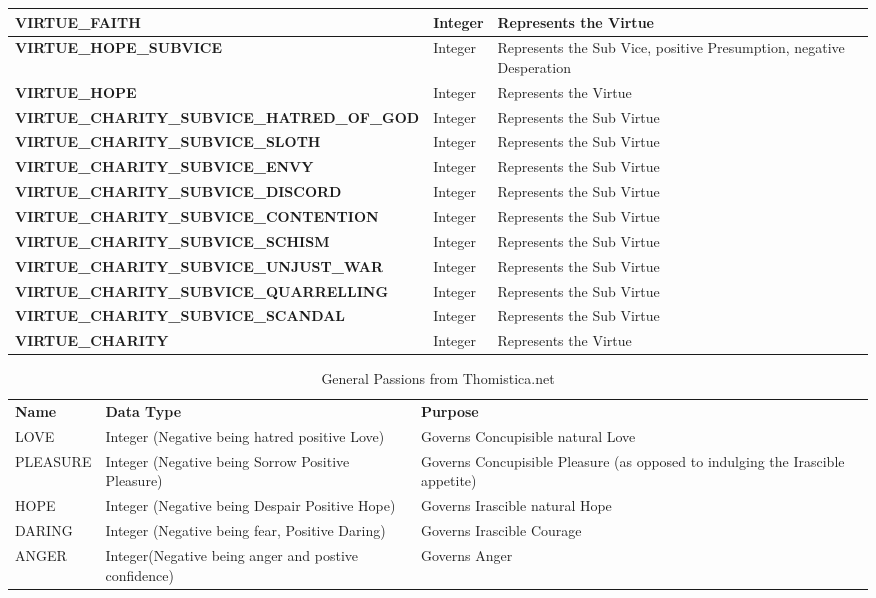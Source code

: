 \documentclass[10pt]{article}
\begin{document}
\begin{longtable}{| p{11cm} | p{3cm} | p{5cm} |}
\hline
\textbf{VIRTUE\_FAITH} & Integer & Represents the Virtue \\
\hline
\textbf{VIRTUE\_HOPE\_SUBVICE} & Integer & Represents the Sub Vice, positive Presumption, negative Desperation \\
\hline
\textbf{VIRTUE\_HOPE} & Integer & Represents the Virtue \\
\hline
\textbf{VIRTUE\_CHARITY\_SUBVICE\_HATRED\_OF\_GOD} & Integer & Represents the Sub Virtue \\
\hline
\textbf{VIRTUE\_CHARITY\_SUBVICE\_SLOTH} & Integer & Represents the Sub Virtue \\
\hline
\textbf{VIRTUE\_CHARITY\_SUBVICE\_ENVY} & Integer & Represents the Sub Virtue \\
\hline
\textbf{VIRTUE\_CHARITY\_SUBVICE\_DISCORD} & Integer & Represents the Sub Virtue \\
\hline
\textbf{VIRTUE\_CHARITY\_SUBVICE\_CONTENTION} & Integer & Represents the Sub Virtue \\
\hline
\textbf{VIRTUE\_CHARITY\_SUBVICE\_SCHISM} & Integer & Represents the Sub Virtue \\
\hline
\textbf{VIRTUE\_CHARITY\_SUBVICE\_UNJUST\_WAR} & Integer & Represents the Sub Virtue \\
\hline
\textbf{VIRTUE\_CHARITY\_SUBVICE\_QUARRELLING} & Integer & Represents the Sub Virtue \\
\hline
\textbf{VIRTUE\_CHARITY\_SUBVICE\_SCANDAL} & Integer & Represents the Sub Virtue \\
\hline
\textbf{VIRTUE\_CHARITY} & Integer & Represents the Virtue \\
\hline


\end{longtable}

\begin{longtable}{| p{6cm} | p{3cm} | p{10cm} |}
\caption{General Passions from Thomistica.net}
\label{tab:GeneralPassions}\\
\hline 
\textbf{Name} & \textbf{Data Type} & \textbf{Purpose} \\
LOVE & Integer (Negative being hatred positive Love) & Governs Concupisible natural Love \\
\hline
PLEASURE & Integer (Negative being Sorrow Positive Pleasure) & Governs Concupisible Pleasure (as opposed to indulging the Irascible appetite) \\
\hline
HOPE & Integer (Negative being Despair Positive Hope) & Governs Irascible natural Hope \\
\hline
DARING & Integer (Negative being fear, Positive Daring) & Governs Irascible Courage \\
\hline
ANGER & Integer(Negative being anger and postive confidence) & Governs Anger\\
\hline
\end{longtable}
\end{document}

